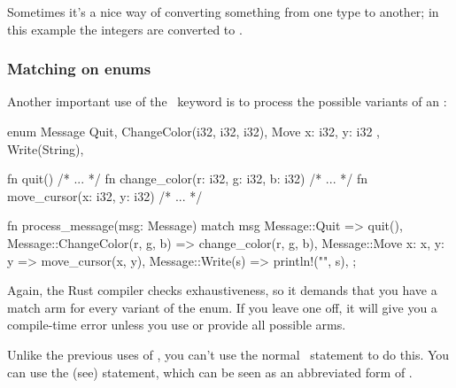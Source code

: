 Sometimes it's a nice way of converting something from one type to another; in this example the integers are converted to \String.

\subsubsection*{Matching on enums}

Another important use of the \match\ keyword is to process the possible variants of an \enum:

\begin{rustc}
enum Message {
    Quit,
    ChangeColor(i32, i32, i32),
    Move { x: i32, y: i32 },
    Write(String),
}

fn quit() { /* ... */ }
fn change_color(r: i32, g: i32, b: i32) { /* ... */ }
fn move_cursor(x: i32, y: i32) { /* ... */ }

fn process_message(msg: Message) {
    match msg {
        Message::Quit => quit(),
        Message::ChangeColor(r, g, b) => change_color(r, g, b),
        Message::Move { x: x, y: y } => move_cursor(x, y),
        Message::Write(s) => println!("{}", s),
    };
}
\end{rustc}

Again, the Rust compiler checks exhaustiveness, so it demands that you have a match arm for every variant of the enum. If you leave 
one off, it will give you a compile-time error unless you use \code{\_} or provide all possible arms.

\blank

Unlike the previous uses of \match, you can't use the normal \keyif\ statement to do this. You can use the  (see) 
statement, which can be seen as an abbreviated form of \match.
